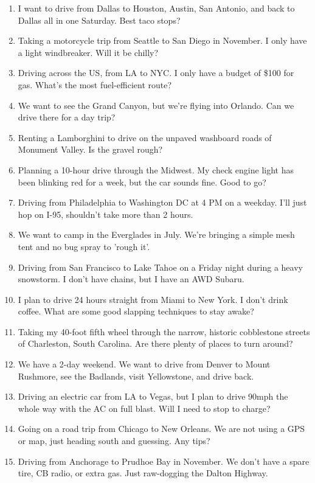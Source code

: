 \documentclass[12pt]{article}
\begin{document}
\begin{enumerate}
    \item I want to drive from Dallas to Houston, Austin, San Antonio, and back to Dallas all in one Saturday. Best taco stops?
    \item Taking a motorcycle trip from Seattle to San Diego in November. I only have a light windbreaker. Will it be chilly?
    \item Driving across the US, from LA to NYC. I only have a budget of \$100 for gas. What's the most fuel-efficient route?
    \item We want to see the Grand Canyon, but we're flying into Orlando. Can we drive there for a day trip?
    \item Renting a Lamborghini to drive on the unpaved washboard roads of Monument Valley. Is the gravel rough?
    \item Planning a 10-hour drive through the Midwest. My check engine light has been blinking red for a week, but the car sounds fine. Good to go?
    \item Driving from Philadelphia to Washington DC at 4 PM on a weekday. I'll just hop on I-95, shouldn't take more than 2 hours.
    \item We want to camp in the Everglades in July. We're bringing a simple mesh tent and no bug spray to 'rough it'.
    \item Driving from San Francisco to Lake Tahoe on a Friday night during a heavy snowstorm. I don't have chains, but I have an AWD Subaru.
    \item I plan to drive 24 hours straight from Miami to New York. I don't drink coffee. What are some good slapping techniques to stay awake?
    \item Taking my 40-foot fifth wheel through the narrow, historic cobblestone streets of Charleston, South Carolina. Are there plenty of places to turn around?
    \item We have a 2-day weekend. We want to drive from Denver to Mount Rushmore, see the Badlands, visit Yellowstone, and drive back.
    \item Driving an electric car from LA to Vegas, but I plan to drive 90mph the whole way with the AC on full blast. Will I need to stop to charge?
    \item Going on a road trip from Chicago to New Orleans. We are not using a GPS or map, just heading south and guessing. Any tips?
    \item Driving from Anchorage to Prudhoe Bay in November. We don't have a spare tire, CB radio, or extra gas. Just raw-dogging the Dalton Highway.

\end{enumerate}
\end{document}
